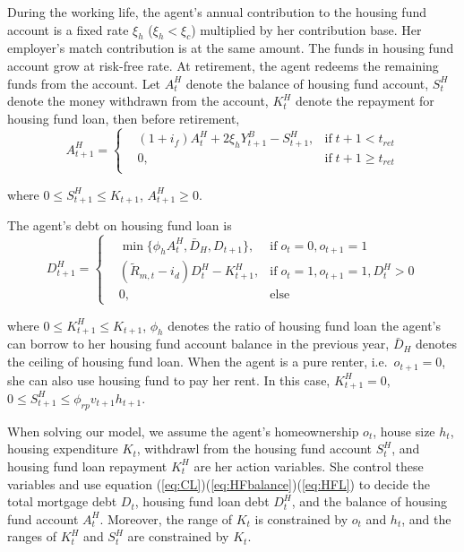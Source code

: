 \documentclass[
  12pt,
]{article}
\begin{document}
During the working life, the agent's annual contribution to the housing
fund account is a fixed rate \(\xi_h\) (\(\xi_h<\xi_c\)) multiplied by
her contribution base. Her employer's match contribution is at the same
amount. The funds in housing fund account grow at risk-free rate. At
retirement, the agent redeems the remaining funds from the account. Let
\(A^H_t\) denote the balance of housing fund account, \(S^H_t\) denote
the money withdrawn from the account, \(K^H_t\) denote the repayment for
housing fund loan, then before retirement,
\begin{equation}\label{eq:HFbalance}
A^H_{t+1}= \left\{
\begin{aligned}
& (1+i_f)A^H_t+2\xi_h Y^B_{t+1} - S^H_{t+1}, & \text{if} \; t+1<t_{ret}\\
& 0, & \text{if} \; t+1 \geq t_{ret}\\
\end{aligned}
\right.
\end{equation}

where \(0\leq S^H_{t+1}\leq K_{t+1}\), \(A^H_{t+1}\geq 0\).

The agent's debt on housing fund loan is \begin{equation}\label{eq:HFL}
D^H_{t+1} = \left\{
\begin{aligned}
& \min\{\phi_h A^H_t,\bar{D}_{H},D_{t+1}\},& \text{if} \;o_t=0,o_{t+1}=1\\
& (\tilde{R}_{m,t}-i_d)D^H_t - K^H_{t+1},& \text{if} \;o_t=1,o_{t+1}=1,D^H_t>0\\
& 0,& \text{else}
\end{aligned}
\right.
\end{equation}

where \(0\leq K^H_{t+1}\leq K_{t+1}\), \(\phi_h\) denotes the ratio of
housing fund loan the agent's can borrow to her housing fund account
balance in the previous year, \(\bar{D}_{H}\) denotes the ceiling of
housing fund loan. When the agent is a pure renter, i.e.~\(o_{t+1}=0\),
she can also use housing fund to pay her rent. In this case,
\(K^H_{t+1}=0\), \(0 \leq S^H_{t+1} \leq \phi_{rp} v_{t+1}h_{t+1}\).

When solving our model, we assume the agent's homeownership \(o_t\),
house size \(h_t\), housing expenditure \(K_t\), withdrawl from the
housing fund account \(S^H_t\), and housing fund loan repayment
\(K^H_t\) are her action variables. She control these variables and use
equation (\ref{eq:CL})(\ref{eq:HFbalance})(\ref{eq:HFL}) to decide the
total mortgage debt \(D_t\), housing fund loan debt \(D^H_t\), and the
balance of housing fund account \(A^H_t\). Moreover, the range of
\(K_t\) is constrained by \(o_t\) and \(h_t\), and the ranges of
\(K^H_t\) and \(S^H_t\) are constrained by \(K_t\).
\end{document}
